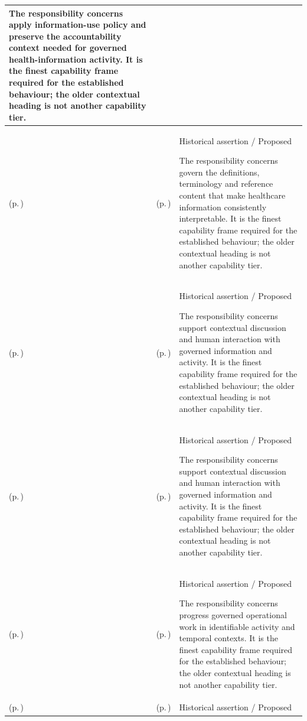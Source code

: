 \begin{longtable}{|>{\raggedright\arraybackslash}p{0.27\TableWidth}|>{\raggedright\arraybackslash}p{0.27\TableWidth}|>{\raggedright\arraybackslash}p{0.46\TableWidth}|}
The responsibility concerns apply information-use policy and preserve the accountability context needed for governed health-information activity. It is the finest capability frame required for the established behaviour; the older contextual heading is not another capability tier.\\\hline
\nameref{cap:bec-semantic-reference-knowledge-enablement} (p.\,\pageref{cap:bec-semantic-reference-knowledge-enablement}) & \nameref{cap:bec-clinical-knowledge-services} (p.\,\pageref{cap:bec-clinical-knowledge-services}) & Historical assertion / Proposed

The responsibility concerns govern the definitions, terminology and reference content that make healthcare information consistently interpretable. It is the finest capability frame required for the established behaviour; the older contextual heading is not another capability tier.\\\hline
\nameref{cap:bec-collaborative-interaction-enablement} (p.\,\pageref{cap:bec-collaborative-interaction-enablement}) & \nameref{cap:bec-clinical-collaboration} (p.\,\pageref{cap:bec-clinical-collaboration}) & Historical assertion / Proposed

The responsibility concerns support contextual discussion and human interaction with governed information and activity. It is the finest capability frame required for the established behaviour; the older contextual heading is not another capability tier.\\\hline
\nameref{cap:bec-collaborative-interaction-enablement} (p.\,\pageref{cap:bec-collaborative-interaction-enablement}) & \nameref{cap:bec-general-collaboration} (p.\,\pageref{cap:bec-general-collaboration}) & Historical assertion / Proposed

The responsibility concerns support contextual discussion and human interaction with governed information and activity. It is the finest capability frame required for the established behaviour; the older contextual heading is not another capability tier.\\\hline
\nameref{cap:bec-operational-activity-temporal-enablement} (p.\,\pageref{cap:bec-operational-activity-temporal-enablement}) & \nameref{cap:bec-workflow-activity-coordination} (p.\,\pageref{cap:bec-workflow-activity-coordination}) & Historical assertion / Proposed

The responsibility concerns progress governed operational work in identifiable activity and temporal contexts. It is the finest capability frame required for the established behaviour; the older contextual heading is not another capability tier.\\\hline
\nameref{cap:bec-operational-activity-temporal-enablement} (p.\,\pageref{cap:bec-operational-activity-temporal-enablement}) & \nameref{cap:bec-calendar-management} (p.\,\pageref{cap:bec-calendar-management}) & Historical assertion / Proposed


\end{longtable}
